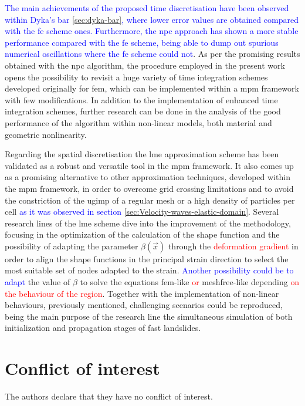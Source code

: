 \documentclass[preprint,12pt,a4paper]{elsarticle}
\begin{document}
\textcolor{blue}{The main achievements of the proposed time discretisation have been observed within Dyka's bar \ref{sec:dyka-bar}, where lower error values are obtained compared with the \acrfull{fe} scheme ones. Furthermore, the \acrshort{npc} approach has shown a more stable performance compared with the \acrshort{fe} scheme, being able to dump out spurious numerical oscillations where the \acrshort{fe} scheme could not}. As per the promising results obtained with the \acrshort{npc} algorithm, the procedure employed in the present work opens the possibility to revisit a huge variety of time integration schemes developed originally for \acrshort{fem}, which can be implemented within a \acrshort{mpm} framework with few modifications. In addition to the implementation of enhanced time integration schemes, further research can be done in the analysis of the good performance of the algorithm within non-linear models, both material and geometric nonlinearity.

Regarding the spatial discretisation the \acrfull{lme} approximation scheme has been validated as a robust and versatile tool in the \acrshort{mpm} framework. It also comes up as a promising alternative to other approximation techniques, developed within the \acrshort{mpm} framework, in order to overcome grid crossing limitations and to avoid the constriction of the \acrshort{ugimp} of a regular mesh or a high density of particles per cell \textcolor{blue}{as it was observed in section \ref{sec:Velocity-waves-elastic-domain}}. Several research lines of the \acrshort{lme} scheme dive into the improvement of the methodology, focusing in the optimization of the calculation of the shape function and the possibility of adapting the parameter $\beta(\vec{x})$ through the \textcolor{red}{deformation gradient} in order to align the shape functions in the principal strain direction to select the most suitable set of nodes adapted to the strain. \textcolor{blue}{Another possibility could be to adapt}  the value of $\beta$ to solve the equations \acrshort{fem}-like \textcolor{red}{or} meshfree-like depending  \textcolor{red}{on the behaviour of the region}. Together with the implementation of non-linear behaviours, previously mentioned, challenging scenarios could be reproduced, being the main purpose of the research line the simultaneous simulation of both initialization and propagation stages of fast landslides.

% 
\section*{Conflict of interest}
%
The authors declare that they have no conflict of interest.
\end{document}
